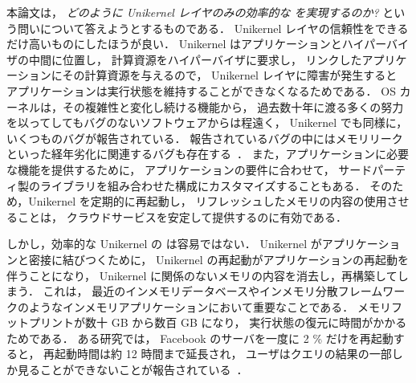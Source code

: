 
本論文は，
\emph{どのように Unikernel レイヤのみの効率的な \rr を実現するのか?}
という問いについて答えようとするものである．
Unikernel レイヤの信頼性をできるだけ高いものにしたほうが良い．
Unikernel はアプリケーションとハイパーバイザの中間に位置し，
計算資源をハイパーバイザに要求し，
リンクしたアプリケーションにその計算資源を与えるので，
Unikernel レイヤに障害が発生すると
アプリケーションは実行状態を維持することができなくなるためである．
OS カーネルは，その複雑性と変化し続ける機能から，
過去数十年に渡る多くの努力~\cite{ChouEtAl-SOSP01,PalixEtAl-ASPLOS11,Syzkaller,PanEtAl-SEC17,PailoorEtAl-SEC18,SchumiloEtAl-kAFL, TalebiEtAl-SEC21}
を以ってしてもバグのないソフトウェアからは程遠く，
Unikernel でも同様に，いくつものバグが報告されている\cite{Issues-Unikraft,Issues-OSv,Issues-Mirage}．
報告されているバグの中にはメモリリークといった経年劣化に関連するバグも存在する~\cite{Memleak-Unikraft,Memleak-Mirage}．
また，アプリケーションに必要な機能を提供するために，
アプリケーションの要件に合わせて，
サードパーティ製のライブラリを組み合わせた構成にカスタマイズすることもある．
そのため，Unikernel を定期的に再起動し，
リフレッシュしたメモリの内容の使用させることは，
クラウドサービスを安定して提供するのに有効である．

しかし，効率的な Unikernel の \rr は容易ではない．
Unikernel がアプリケーションと密接に結びつくために，
Unikernel の再起動がアプリケーションの再起動を伴うことになり，
Unikernel に関係のないメモリの内容を消去し，再構築してしまう．
これは，
最近のインメモリデータベースやインメモリ分散フレームワークのようなインメモリアプリケーションにおいて重要なことである．
メモリフットプリントが数十 GB から数百 GB になり，
実行状態の復元に時間がかかるためである．
ある研究では，
Facebook のサーバを一度に 2 \% だけを再起動すると，
再起動時間は約 12 時間まで延長され，
ユーザはクエリの結果の一部しか見ることができないことが報告されている~\cite{GoelEtAl-SIGMOD14}．

